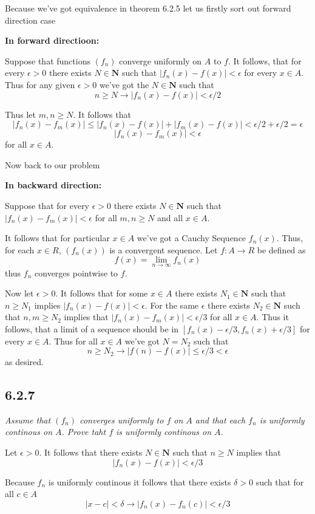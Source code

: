 \documentclass[11pt,oneside,titlepage]{book}
\begin{document}
Because we've got equivalence in theorem 6.2.5 let us firstly sort
out forward direction case

\textbf{In forward directioon:}

Suppose that functions $(f_n)$ converge uniformly on $A$ to $f$. It follows,
that for every $\epsilon > 0$ there exists $N \in \textbf{N}$ such that
$|f_n(x) - f(x)| < \epsilon$ for every $x \in A$. Thus for any given
$\epsilon > 0$ we've got the $N \in \textbf{N}$ such that
$$n \geq N \to |f_n(x) - f(x)| < \epsilon / 2$$

Thus let $m, n \geq N$. It follows that
$$|f_n(x) - f_m(x)| \leq |f_n(x) - f(x)| + |f_m(x) - f(x)| < \epsilon/2 + \epsilon/2 = \epsilon$$
$$|f_n(x) - f_m(x)| <  \epsilon$$
for all $x \in A$.

Now back to our problem

\textbf{In backward direction:}

Suppose that for every $\epsilon > 0$ there exists $N \in \textbf{N}$ such
that $|f_n(x) - f_m(x)| < \epsilon$ for all $m, n \geq N$ and all $x \in A$.

It follows that for particular $x \in A$ we've got a Cauchy Sequence
$f_n(x)$. Thus, for each $x \in R$, $(f_n(x))$ is a convergent sequence.
Let $f: A \to R$ be defined as
$$f(x) = \lim_{n \to \infty}f_n(x)$$
thus $f_n$ converges pointwise to $f$.

Now let $\epsilon > 0$. It follows that for some $x \in A$ there exists
$N_1 \in \textbf{N}$ such that $n \geq N_1$ implies
$|f_n(x) - f(x)| < \epsilon$. For the same $\epsilon$ there exists
$N_2 \in \textbf{N}$ such that $n, m \geq N_2$ implies that
$|f_n(x) - f_m(x)| < \epsilon/3$ for all $x \in A$. Thus
it follows, that a limit of a sequence should be in $[f_n(x) - \epsilon/3,
f_n(x) + \epsilon/3]$ for every $x \in A$. Thus for all $x \in A$
we've got $N = N_2$ such that
$$n \geq N_2 \to |f(n) - f(x)| \leq \epsilon/ 3 < \epsilon$$
as desired.

\subsection*{6.2.7}
\textit{Assume that $(f_n)$ converges uniformly to $f$ on $A$ and that each
  $f_n$ is uniformly continous on $A$. Prove taht $f$ is uniformly continous
  on $A$.}

Let $\epsilon > 0$. It follows that there exists $N \in \textbf{N}$ such that
$n \geq N$ implies that
$$|f_n(x) - f(x)| < \epsilon/3$$

Because $f_n$ is
uniformly continous it follows that there exists $\delta > 0$ such that
for all $c \in A$
$$|x - c| < \delta  \to |f_n(x) - f_n(c)| < \epsilon/3$$
\end{document}
